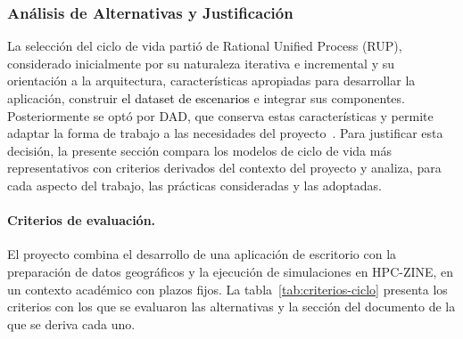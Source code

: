 
\subsubsection{Análisis de Alternativas y Justificación}\label{sec:spmp-8-1-1}
La selección del ciclo de vida partió de Rational Unified Process (RUP), considerado inicialmente por su naturaleza iterativa e incremental y su orientación a la arquitectura, características apropiadas para desarrollar la aplicación, construir \textcolor{black}{el dataset de escenarios} e integrar sus componentes. Posteriormente se optó por DAD, que conserva estas características y permite adaptar la forma de trabajo a las necesidades del proyecto~\cite{adaptacion2026}. Para justificar esta decisión, la presente sección compara los modelos de ciclo de vida más representativos con criterios derivados del contexto del proyecto y analiza, para cada aspecto del trabajo, las prácticas consideradas y las adoptadas.

\paragraph{Criterios de evaluación.}
El proyecto combina el desarrollo de una aplicación de escritorio con la preparación de datos geográficos y la ejecución de simulaciones en HPC-ZINE, en un contexto académico con plazos fijos. La tabla~\ref{tab:criterios-ciclo} presenta los criterios con los que se evaluaron las alternativas y la sección del documento de la que se deriva cada uno.

